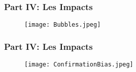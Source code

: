 \begin{frame}
    \frametitle{Part IV: Les Impacts}

    \begin{figure}
        \centering
        \texttt{[image: Bubbles.jpeg]}
    \end{figure}

\end{frame}

\begin{frame}
    \frametitle{Part IV: Les Impacts}

    \begin{figure}
        \centering
        \texttt{[image: ConfirmationBias.jpeg]}
    \end{figure}

\end{frame}